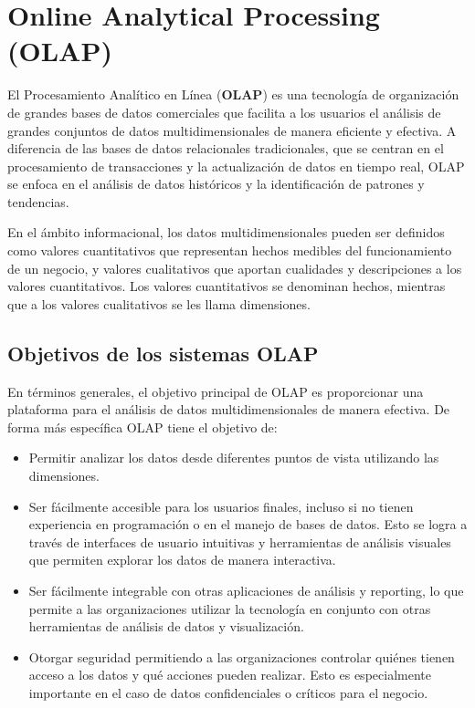 \section{Online Analytical Processing (OLAP)} \label{section:olap}

El Procesamiento Anal\'itico en L\'inea (\textbf{OLAP}) es una tecnología de organización de grandes bases de datos 
comerciales que facilita a los usuarios el an\'alisis de grandes conjuntos de datos multidimensionales de manera 
eficiente y efectiva. A diferencia de las bases de datos relacionales tradicionales, que se centran en el procesamiento 
de transacciones y la actualización de datos en tiempo real, OLAP se enfoca en el análisis de datos históricos y la 
identificación de patrones y tendencias\cite{chaudhuri1997overview}.

En el ámbito informacional, los datos multidimensionales pueden ser definidos como valores cuantitativos que representan hechos medibles del 
funcionamiento de un negocio, y valores cualitativos que aportan cualidades y descripciones a los valores cuantitativos. Los valores cuantitativos 
se denominan hechos, mientras que a los valores cualitativos se les llama dimensiones\cite{lismaster}.

\subsection{Objetivos de los sistemas OLAP}

En términos generales, el objetivo principal de OLAP es proporcionar una plataforma para el análisis de datos 
multidimensionales de manera efectiva. De forma m\'as espec\'ifica OLAP tiene el objetivo de: 

\begin{itemize}
    \item Permitir analizar los datos desde 
        diferentes puntos de vista utilizando las dimensiones.
    \item Ser fácilmente accesible para los usuarios finales, incluso si no tienen experiencia en programación o en el 
        manejo de bases de datos. Esto se logra a través de interfaces de usuario intuitivas y herramientas de análisis 
        visuales que permiten explorar los datos de manera interactiva.
    \item Ser f\'acilmente integrable con otras aplicaciones de análisis y reporting, lo que permite a las organizaciones 
        utilizar la tecnología en conjunto con otras herramientas de análisis de datos y visualización.
    \item Otorgar seguridad permitiendo a las organizaciones controlar quiénes tienen acceso a los datos y qué acciones 
        pueden realizar. Esto es especialmente importante en el caso de datos confidenciales o críticos para el negocio.
\end{itemize}

